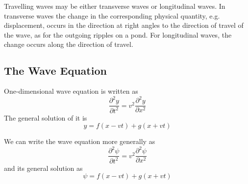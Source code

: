 \documentclass[../../../main.tex]{subfiles}
\begin{document}
Travelling waves may be either transverse waves or longitudinal waves. In transverse waves the change in the corresponding physical quantity, e.g. displacement, occurs in the direction at right angles to the direction of travel of the wave, as for the outgoing ripples on a pond. For longitudinal waves, the change occurs along the direction of travel. 

\subsection*{The Wave Equation}
One-dimensional wave equation is written as 
\begin{equation*}
    \frac{\partial^2 y}{\partial t^2}= v^2 \frac{\partial^2 y}{\partial x^2}
\end{equation*}
The general solution of it is 
\begin{equation*}
    y = f (x - vt) + g(x + vt)
\end{equation*}

We can write the wave equation more generally as
\begin{equation*}
    \frac{\partial^2 \psi}{\partial t^2}= v^2 \frac{\partial^2 \psi}{\partial x^2}
\end{equation*}
and its general solution as
\begin{equation*}
    \psi=f (x - vt) + g(x + vt)
\end{equation*}
\end{document}
